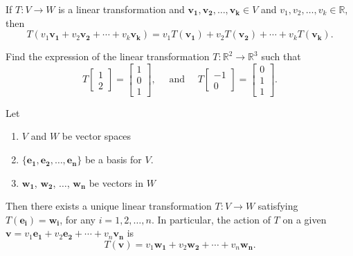 \documentclass[20pt,a4paper]{extarticle}
\newcommand{\ra}{\rightarrow}
\newcounter{example}
\newcounter{theorem}
\begin{document}
\newpage 

\phantom{2}

\vfill

\begin{theorem}
If $T : V \ra W$ is a linear transformation and $\mathbf{v_1}, \mathbf{v_2}, \ldots , \mathbf{v_k} \in V$ and $v_1, v_2, \ldots , v_k \in \mathbb{R}$, then
	\[
		T (v_1 \mathbf{v_1} + v_2 \mathbf{v_2} + \cdots + v_k \mathbf{v_k} ) = v_1 T (\mathbf{v_1}) + v_2 T (\mathbf{v_2}) + \cdots + v_k T (\mathbf{v_k}) .
	\]
\end{theorem}

\newpage 

\begin{example}
Find the expression of the linear transformation $T : \mathbb{R}^2 \ra \mathbb{R}^3$ such that
	\[
		T \begin{bmatrix} 1 \\ 2 \end{bmatrix} = \begin{bmatrix} 1 \\ 0 \\ 1 \end{bmatrix}, \quad \text{ and } \quad T \begin{bmatrix} -1 \\ 0 \end{bmatrix} = \begin{bmatrix} 0 \\ 1 \\ 1 \end{bmatrix} .
	\]
\end{example}

\begin{solution}

\end{solution}

\newpage 

\phantom{2}

\vfill

\begin{theorem}
Let 
\begin{enumerate}[label=\Circled{\arabic*}]
\item $V$ and $W$ be vector spaces
\item $\{ \mathbf{e_1} , \mathbf{e_2} , \ldots , \mathbf{e_n} \}$ be a basis for $V$. 
\item $\mathbf{w_1}$, $\mathbf{w_2}$, $\ldots$, $\mathbf{w_n}$ be vectors in $W$
\end{enumerate}
Then there exists a unique linear transformation $T : V \ra W$ satisfying $T (\mathbf{e_i}) = \mathbf{w_i}$, for any $i = 1, 2, \ldots , n$. In particular, the action of $T$ on a given $\mathbf{v} = v_1 \mathbf{e_1} + v_2 \mathbf{e_2} + \cdots + v_n \mathbf{v_n}$ is
	\[
		T (\mathbf{v}) = v_1 \mathbf{w_1} + v_2 \mathbf{w_2} + \cdots + v_n \mathbf{w_n} .
	\]
\end{theorem}
\end{document}
